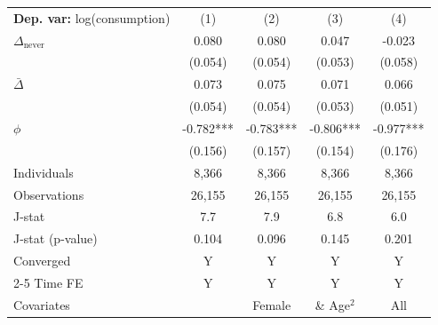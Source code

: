 \begin{tabular}{l cccc} \toprule  \textbf{Dep. var:}  log(consumption) 
                    &\multicolumn{1}{c}{(1)}   &\multicolumn{1}{c}{(2)}   &\multicolumn{1}{c}{(3)}   &\multicolumn{1}{c}{(4)}   \\

\addlinespace
$\Delta_{\text{never}}$&       0.080   &       0.080   &       0.047   &      -0.023   \\
                    &     (0.054)   &     (0.054)   &     (0.053)   &     (0.058)   \\

\addlinespace
$\bar{\Delta}$      &       0.073   &       0.075   &       0.071   &       0.066   \\
                    &     (0.054)   &     (0.054)   &     (0.053)   &     (0.051)   \\

\addlinespace
$\phi$              &      -0.782***&      -0.783***&      -0.806***&      -0.977***\\
                    &     (0.156)   &     (0.157)   &     (0.154)   &     (0.176)   \\
\addlinespace
Individuals         &       8,366   &       8,366   &       8,366   &       8,366   \\
Observations        &      26,155   &      26,155   &      26,155   &      26,155   \\
J-stat              &         7.7   &         7.9   &         6.8   &         6.0   \\
J-stat (p-value)    &       0.104   &       0.096   &       0.145   &       0.201   \\
Converged           &           Y   &           Y   &           Y   &           Y   \\
\cmidrule{2-5} Time FE & Y & Y & Y & Y \\ Covariates & & Female & \& Age$^2$ & All \\ \bottomrule \end{tabular}
